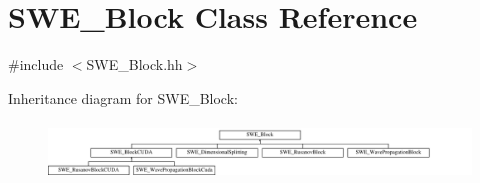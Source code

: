 \hypertarget{classSWE__Block}{\section{S\-W\-E\-\_\-\-Block Class Reference}
\label{classSWE__Block}
}


{\ttfamily \#include $<$S\-W\-E\-\_\-\-Block.\-hh$>$}

Inheritance diagram for S\-W\-E\-\_\-\-Block\-:\begin{figure}[H]
\begin{center}
\leavevmode
\includegraphics[height=1.562791cm]{classSWE__Block}
\end{center}
\end{figure}
